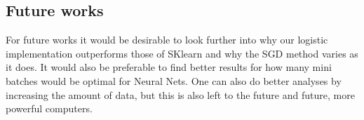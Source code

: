 \subsection{Future works}
For future works it would be desirable to look further into why our logistic implementation outperforms those of SKlearn and why the SGD method varies as it does. It would also be preferable to find better results for how many mini batches would be optimal for Neural Nets. One can also do better analyses by increasing the amount of data, but this is also left to the future and future, more powerful computers.
